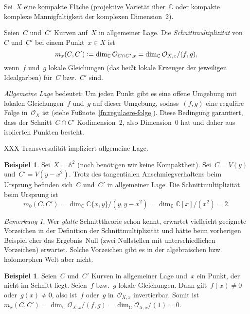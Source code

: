 \documentclass[a4paper,ngerman,12pt]{scrartcl}
\theoremstyle{definition}
\newtheorem{ex}[defn]{Beispiel}
\theoremstyle{plain}
\theoremstyle{remark}
\newtheorem{rem}[defn]{Bemerkung}
\renewcommand{\AA}{\mathbb{A}}
\newcommand{\CC}{\mathbb{C}}
\renewcommand{\O}{\mathcal{O}}
\newcommand{\defeq}{\vcentcolon=}
\begin{document}
Sei~$X$ eine kompakte Fläche (projektive Varietät über~$\CC$ oder
kompakte komplexe Mannigfaltigkeit der komplexen Dimension~2).

\begin{defn}Seien~$C$ und~$C'$ Kurven auf~$X$ in allgemeiner Lage. Die
\emph{Schnittmultiplizität} von~$C$ und~$C'$ bei einem Punkt~$x \in X$ ist
\[ m_x(C,C') \defeq \dim_\CC \O_{C \cap C',x} = \dim_\CC \O_{X,x}/(f,g), \]
wenn~$f$ und~$g$ lokale Gleichungen (das heißt lokale Erzeuger der jeweiligen
Idealgarben) für~$C$ bzw.~$C'$ sind.
\end{defn}

\emph{Allgemeine Lage} bedeutet: Um jeden Punkt gibt es eine offene Umgebung
mit lokalen Gleichungen~$f$ und~$g$ auf dieser Umgebung, sodass~$(f,g)$ eine
reguläre Folge in~$\O_X$ ist (siehe Fußnote~\ref{fn:regulaere-folge}). Diese
Bedingung garantiert, dass der Schnitt~$C \cap C'$ Kodimension~2, also
Dimension~0 hat und daher aus isolierten Punkten besteht.

XXX Transversalität impliziert allgemeine Lage.

\begin{ex}Sei~$X = \AA^2$ (noch benötigen wir keine Kompaktheit). Sei~$C = V(y)$
und~$C' = V(y-x^2)$. Trotz des tangentialen Anschmiegverhaltens beim Ursprung
befinden sich~$C$ und~$C'$ in allgemeiner Lage. Die Schnittmultiplizität beim
Ursprung ist
\[ m_0(C,C') = \dim_\CC \CC\{x,y\}/(y,y-x^2) = \dim_\CC \CC[x]/(x^2) =
2. \]\end{ex}

\begin{rem}Wer \emph{glatte} Schnitttheorie schon kennt, erwartet vielleicht geeignete
Vorzeichen in der Definition der Schnittmultiplizität und hätte beim vorherigen
Beispiel eher das Ergebnis~Null (zwei Nullstellen mit unterschiedlichen
Vorzeichen) erwartet. Solche Vorzeichen gibt es in der algebraischen bzw.
holomorphen Welt aber nicht.
\end{rem}

\begin{ex}Seien~$C$ und~$C'$ Kurven in allgemeiner Lage und~$x$ ein Punkt, der
nicht im Schnitt liegt. Seien~$f$ bzw.~$g$ lokale Gleichungen. Dann gilt~$f(x)
\neq 0$ oder~$g(x) \neq 0$, also ist~$f$ oder~$g$ in~$\O_{X,x}$ invertierbar.
Somit ist~$m_x(C,C') = \dim_\CC \O_{X,x}/(f,g) = \dim_\CC \O_{X,x}/(1) =
0$.\end{ex}
\end{document}
